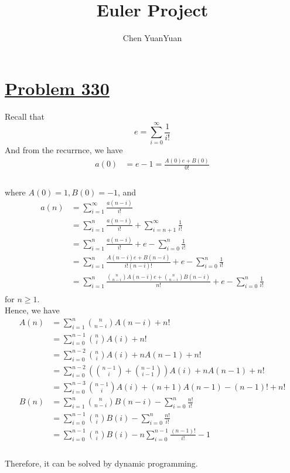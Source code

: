 \documentclass{article}
\title{Euler Project}
\author{Chen YuanYuan}
\newcommand{\problemsection}[1]{\section{\href{https://projecteuler.net/problem=#1}{Problem #1}}}
\begin{document}
\maketitle
\problemsection{330}
Recall that  \\
\[
  e=\sum_{i=0}^{\infty}\frac{1}{i!}
\]
And from the recurrnce, we have \\
\begin{align*}
  a(0) & =e-1=\frac{A(0)e+B(0)}{0!} \\
\end{align*} \\
where $A(0)=1,B(0)=-1$, and \\
\begin{align*}
  a(n) & =\sum_{i=1}^{\infty}\frac{a(n-i)}{i!}                                                             \\
       & =\sum_{i=1}^{n}\frac{a(n-i)}{i!}+\sum_{i=n+1}^{\infty}\frac{1}{i!}                                \\
       & =\sum_{i=1}^{n}\frac{a(n-i)}{i!}+e-\sum_{i=0}^{n}\frac{1}{i!}                                     \\
       & =\sum_{i=1}^{n}\frac{A(n-i)e+B(n-i)}{i!(n-i)!}+e-\sum_{i=0}^{n}\frac{1}{i!}                       \\
       & =\sum_{i=1}^{n}\frac{\binom{n}{n-i}A(n-i)e+\binom{n}{n-i}B(n-i)}{n!}+e-\sum_{i=0}^{n}\frac{1}{i!} \\
\end{align*}
for $n\geq 1$.\\
Hence, we have
\begin{align*}
  A(n) & =\sum_{i=1}^{n}\binom{n}{n-i}A(n-i)+n!                                 \\
       & =\sum_{i=0}^{n-1}\binom{n}{i}A(i)+n!                                   \\
       & =\sum_{i=0}^{n-2}\binom{n}{i}A(i)+nA(n-1)+n!                           \\
       & =\sum_{i=0}^{n-2}(\binom{n-1}{i}+\binom{n-1}{i-1})A(i)+nA(n-1)+n!      \\
       & =\sum_{i=0}^{n-3}\binom{n-1}{i}A(i)+(n+1)A(n-1)-(n-1)!+n!              \\
  B(n) & =\sum_{i=1}^{n}\binom{n}{n-i}B(n-i)-\sum_{i=0}^{n}\frac{n!}{i!}        \\
       & =\sum_{i=0}^{n-1}\binom{n}{i}B(i)-\sum_{i=0}^{n}\frac{n!}{i!}          \\
       & =\sum_{i=0}^{n-1}\binom{n}{i}B(i)-n\sum_{i=0}^{n-1}\frac{(n-1)!}{i!}-1 \\
\end{align*} \\
Therefore, it can be solved by dynamic programming.
\end{document}
